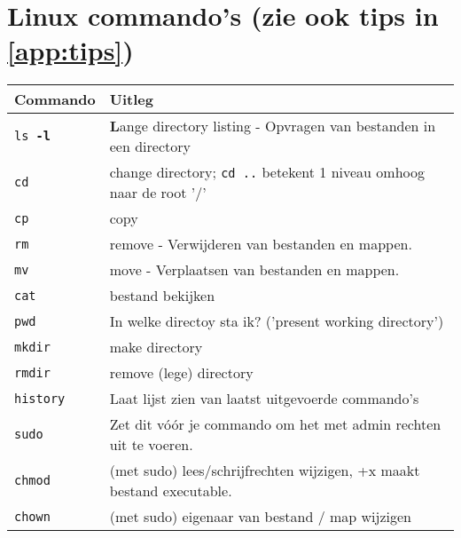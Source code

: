 \break
\section{\textbf{Linux commando's} (zie ook tips in \ref{app:tips})}\label{app:commands}

\begin{table}[h!]
	\begin{tabular}{|l|l|}
		\hline
		Commando & Uitleg \\ \hline
		\texttt{ls \textbf{-l}} & \textbf{L}ange directory listing - Opvragen van bestanden in een directory  \\ \hline
		\texttt{cd} & change directory; \texttt{cd ..} betekent 1 niveau omhoog naar de root '/' \\ \hline
	    \texttt{cp} & copy \\ \hline
	    \texttt{rm} & remove - Verwijderen van bestanden en mappen. \\ \hline
	    \texttt{mv} & move - Verplaatsen van bestanden en mappen. \\ \hline
	    \texttt{cat} & bestand bekijken \\ \hline
	    \texttt{pwd} & In welke directoy sta ik? ('present working directory') \\ \hline
	    \texttt{mkdir} & make directory \\ \hline
		\texttt{rmdir} & remove (lege) directory \\ \hline
	    \texttt{history} & Laat lijst zien van laatst uitgevoerde commando's \\ \hline
	    \texttt{sudo} & Zet dit vóór je commando om het met admin rechten uit te voeren. \\ \hline
	    \texttt{chmod} & (met sudo) lees/schrijfrechten wijzigen, +x maakt bestand executable. \\ \hline
	    \texttt{chown} & (met sudo) eigenaar van bestand / map wijzigen \\ \hline
	\end{tabular}
\end{table}

